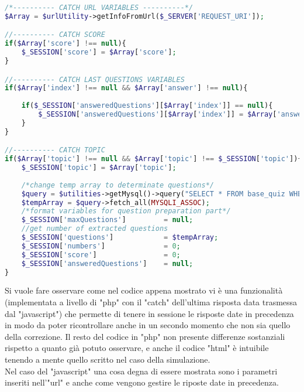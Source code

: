 \begin{lstlisting}[language=php]
/*---------- CATCH URL VARIABLES ----------*/
$Array = $urlUtility->getInfoFromUrl($_SERVER['REQUEST_URI']);

//---------- CATCH SCORE
if($Array['score'] !== null){
	$_SESSION['score'] = $Array['score'];
}

//---------- CATCH LAST QUESTIONS VARIABLES
if($Array['index'] !== null && $Array['answer'] !== null){
	
	if($_SESSION['answeredQuestions'][$Array['index']] == null){
		$_SESSION['answeredQuestions'][$Array['index']] = $Array['answer']; 
	} 
}

//---------- CATCH TOPIC 
if($Array['topic'] !== null && $Array['topic'] !== $_SESSION['topic']){
	$_SESSION['topic'] = $Array['topic'];
	
	/*change temp array to determinate questions*/
	$query = $utilities->getMysql()->query("SELECT * FROM base_quiz WHERE (topic = '{$Array['topic']}')");
	$tempArray = $query->fetch_all(MYSQLI_ASSOC);
	/*format variables for question preparation part*/
	$_SESSION['maxQuestions']         = null;
	//get number of extracted questions
	$_SESSION['questions']            = $tempArray;
	$_SESSION['numbers']              = 0;
	$_SESSION['score']                = 0;
	$_SESSION['answeredQuestions']    = null;
}
\end{lstlisting}

Si vuole fare osservare come nel codice appena mostrato vi è una funzionalità (implementata a livello di "php" con il "catch" dell'ultima risposta data trasmessa dal "javascript") che permette di tenere in sessione le risposte date in precedenza in modo da poter ricontrollare anche in un secondo momento che non sia quello della correzione. Il resto del codice in "php" non presente differenze sostanziali rispetto a quanto già potuto osservare, e anche il codice "html" è intuibile tenendo a mente quello scritto nel caso della simulazione.\\
Nel caso del "javascript" una cosa degna di essere mostrata sono i parametri inseriti nell'"url" e anche come vengono gestire le riposte date in precedenza.\\

